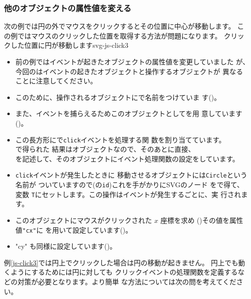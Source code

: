 \subsubsection{他のオブジェクトの属性値を変える}
次の例では円の外でマウスをクリックするとその位置に中心が移動します。
この例ではマウスのクリックした位置を取得する方法が問題になります。
{}
{クリックした位置に円が移動します}{svg-js-click3}
\begin{itemize}
 \item 前の例ではイベントが起きたオブジェクトの属性値を変更していました
       が、今回のはイベントの起きたオブジェクトと操作するオブジェクトが
       異なることに注意してください。
 \item このために、操作されるオブジェクトにで名前をつけていま
       す()。
 \item また、イベントを捕らえるためこのオブジェクトとしてを用
       意しています()。
 \item この長方形にで\texttt{click}イベントを処理する関
       数を割り当てています。\\で得られた
       結果はオブジェクトなので、そのあとに直接、\\
       を記述して、そのオブジェクトにイベント処理関数の設定をしています。
 \item \texttt{click}イベントが発生したときに
移動させるオブジェクトには\texttt{Circle}という名前が
       ついていますので(の\texttt{id})これを手がかりにSVGのノード
       をで得て、変数
       \texttt{T}にセットします。この操作はイベントが発生するごとに、実
			 行されます。
 \item このオブジェクトにマウスがクリックされた $x$ 座標を求め
       ()その値を属性値\texttt{"cx"}に
       を用いて設定しています()。
 \item "cy" も同様に設定しています()。
\end{itemize}
 例\ref{js-click3}では円上でクリックした場合は円の移動が起きません。
円上でも動くようにするためには円に対しても
クリックイベントの処理関数を定義するなどの対策が必要となります。より簡単
な方法については次の問を考えてください。
